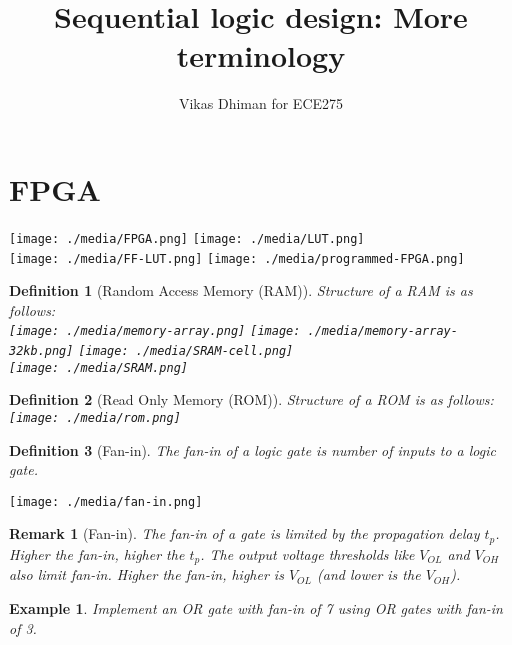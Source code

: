 \documentclass{article}
\author{Vikas Dhiman for ECE275}
\title{Sequential logic design: More terminology}
\newtheorem{example}{Example}
\newtheorem{remark}{Remark}
\newtheorem{definition}{Definition}
\begin{document}
\maketitle


\section{FPGA~\cite[Section~B.6.5]{stephen2022fundamentals}}

\texttt{[image: ./media/FPGA.png]}
\texttt{[image: ./media/LUT.png]}\\
\texttt{[image: ./media/FF-LUT.png]}
\texttt{[image: ./media/programmed-FPGA.png]}


\begin{definition}[Random Access Memory (RAM)] Structure of a RAM is as follows:\\
  \texttt{[image: ./media/memory-array.png]}
  \texttt{[image: ./media/memory-array-32kb.png]}
  \texttt{[image: ./media/SRAM-cell.png]}\\
  \texttt{[image: ./media/SRAM.png]}
\end{definition}

\begin{definition}[Read Only Memory (ROM)] Structure of a ROM is as follows:\\
  \texttt{[image: ./media/rom.png]}
\end{definition}


\begin{definition}[Fan-in]
  The fan-in of a logic gate is number of  inputs to a logic gate.~\cite[Section~B.8.9]{stephen2022fundamentals}
\end{definition}
\texttt{[image: ./media/fan-in.png]}

\begin{remark}[Fan-in]
  The fan-in of a gate is limited by the propagation delay $t_p$. Higher the
  fan-in, higher the $t_p$. The output
  voltage thresholds like $V_{OL}$ and $V_{OH}$ also limit fan-in. Higher the
  fan-in, higher is $V_{OL}$ (and lower is the $V_{OH}$).
\end{remark}

\begin{example}
  Implement an OR gate with fan-in of 7 using OR gates with fan-in of 3.
\end{example}
\vspace{5em}
\end{document}
